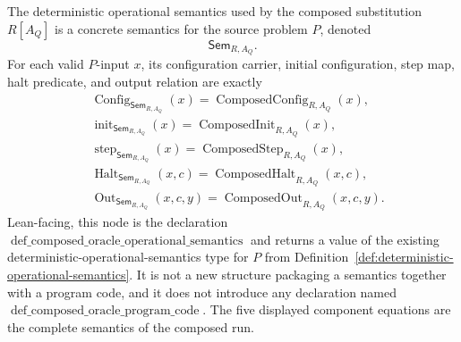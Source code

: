\begin{definition}
  \label{def:composed-oracle-operational-semantics}
  The deterministic operational semantics used by the composed substitution
  $R[A_Q]$ is a concrete semantics for the source problem $P$, denoted
  \[
    \mathsf{Sem}_{R,A_Q}.
  \]
  For each valid $P$-input $x$, its configuration carrier, initial
  configuration, step map, halt predicate, and output relation are exactly
  \[
  \begin{aligned}
    &\operatorname{Config}_{\mathsf{Sem}_{R,A_Q}}(x)
      =\operatorname{ComposedConfig}_{R,A_Q}(x),\\
    &\operatorname{init}_{\mathsf{Sem}_{R,A_Q}}(x)
      =\operatorname{ComposedInit}_{R,A_Q}(x),\\
    &\operatorname{step}_{\mathsf{Sem}_{R,A_Q}}(x)
      =\operatorname{ComposedStep}_{R,A_Q}(x),\\
    &\operatorname{Halt}_{\mathsf{Sem}_{R,A_Q}}(x,c)
      =\operatorname{ComposedHalt}_{R,A_Q}(x,c),\\
    &\operatorname{Out}_{\mathsf{Sem}_{R,A_Q}}(x,c,y)
      =\operatorname{ComposedOut}_{R,A_Q}(x,c,y).
  \end{aligned}
  \]
  Lean-facing, this node is the declaration
  $\operatorname{def\_composed\_oracle\_operational\_semantics}$ and returns a
  value of the existing deterministic-operational-semantics type for $P$ from
  Definition~\ref{def:deterministic-operational-semantics}.  It is not a new
  structure packaging a semantics together with a program code, and it does not
  introduce any declaration named
  $\operatorname{def\_composed\_oracle\_program\_code}$.  The five displayed
  component equations are the complete semantics of the composed run.
\end{definition}

